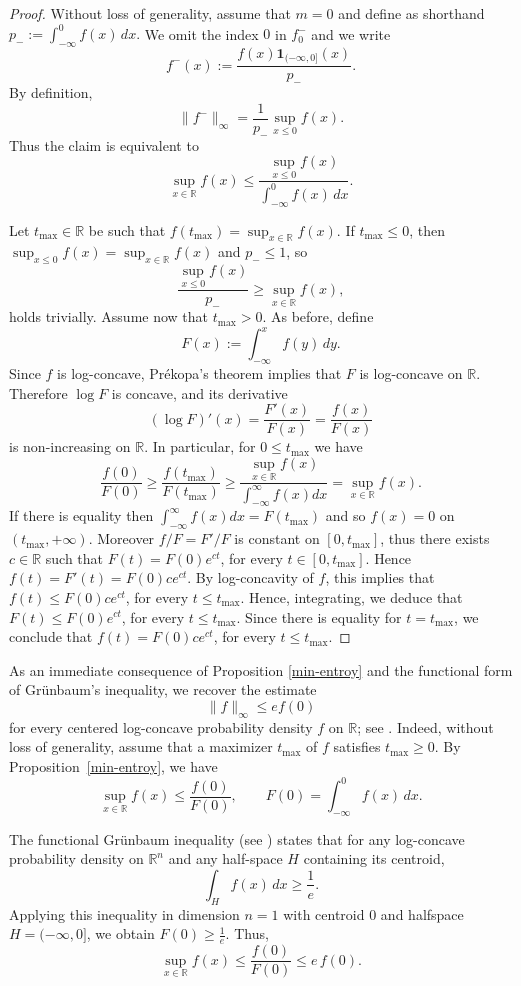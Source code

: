 \documentclass{article}
\theoremstyle{plain}
\theoremstyle{definition}
\newcommand{\1}{\mathbf 1}
\begin{document}
\begin{proof}
Without loss of generality, assume that $m=0$ and define as shorthand
$
p_{-}:=\int_{-\infty}^{0} f(x)\,dx.$
We omit the index $0$ in $f_0^-$ and we write
\[
f^{-}(x):=\frac{f(x)\mathbf 1_{(-\infty,0]}(x)}{p_{-}}.
\]
By definition,
\[
\|f^-\|_\infty
=
\frac{1}{p_{-}}\sup_{x\le 0} f(x).
\]
Thus the claim is equivalent to
\[
\sup_{x\in\mathbb{R}} f(x)
\le
\frac{\sup_{x\le 0} f(x)}{\int_{-\infty}^{0} f(x)\,dx}.
\]

Let $t_{\max}\in\mathbb{R}$ be such that $f(t_{\max})=\sup_{x\in\mathbb{R}} f(x)$. If $t_{\max}\le 0$, then $\sup_{x\le 0} f(x)=\sup_{x\in\mathbb{R}} f(x)$ and $ p_{-}\le 1$, so
\[
\frac{\sup_{x\le 0} f(x)}{p_{-}}\ge \sup_{x\in\mathbb{R}} f(x),
\]
holds trivially. Assume now that $t_{\max}>0$.  
As before, define
\[
F(x):=\int_{-\infty}^{x} f(y)\,dy.
\]
Since $f$ is log-concave,  Pr\'ekopa's theorem implies that $F$ is log-concave on $\mathbb{R}$. Therefore $\log F$ is concave, and its derivative
\[
(\log F)'(x)=\frac{F'(x)}{F(x)}=\frac{f(x)}{F(x)}
\]
is non-increasing on $\mathbb{R}$. In particular, for $0\le t_{\max}$ we have
\[
\frac{f(0)}{F(0)}\ge \frac{f(t_{\max})}{F(t_{\max})}\geq \frac{\sup_{x\in \mathbb{R}}f(x)}{\int_{-\infty}^{\infty} f(x)dx}
=
\sup_{x\in\mathbb{R}} f(x).
\]
If there is equality then $\int_{-\infty}^{\infty} f(x)dx=F(t_{\max})$ and so $f(x) = 0$ on $(t_{\max},+\infty)$. Moreover $f/F=F'/F$ is constant on $[0,t_{\max}]$, thus there exists $c\in\mathbb{R}$ such that $F(t)=F(0)e^{ct}$, for every $t\in[0,t_{\max}]$. Hence $f(t)=F'(t)=F(0)ce^{ct}$. By log-concavity of $f$, this implies that $f(t)\le F(0)ce^{ct}$, for every $t\le t_{\max}$. Hence, integrating, we deduce that $F(t)\le F(0)e^{ct}$, for every $t\le t_{\max}$. Since there is equality for $t=t_{\max}$, we conclude that $f(t)= F(0)ce^{ct}$, for every $t\le t_{\max}$.
\end{proof}

As an immediate consequence of Proposition \ref{min-entroy} and the functional
form of Gr\"unbaum's inequality, we recover the estimate
\[
\|f\|_\infty \leq e f(0)
\]
for every centered log-concave probability density $f$ on $\mathbb R$;
see \cite[Theorem~4]{fradelizisections}.
Indeed, without loss of generality, assume that a maximizer $t_{\max}$ of $f$ satisfies $t_{\max}\ge 0$.
By Proposition~\ref{min-entroy}, we have
\[
\sup_{x\in\mathbb{R}} f(x)\le \frac{f(0)}{F(0)},
\qquad
F(0)=\int_{-\infty}^{0} f(x)\,dx.
\]

The functional Grünbaum inequality (see \cite[Lemma 5.12]{lovasz}) states that for any log-concave probability density on
$\mathbb{R}^n$ and any half-space $H$ containing its centroid,
\[
\int_H f(x)\,dx \ge \frac{1}{e}.
\]
Applying this inequality in dimension $n=1$ with centroid $0$ and halfspace $H=(-\infty,0]$, we obtain
$F(0) \ge \frac{1}{e}.$ Thus,
\[
\sup_{x\in\mathbb{R}} f(x)\le \frac{f(0)}{F(0)}\le e\,f(0).
\]
\end{document}
